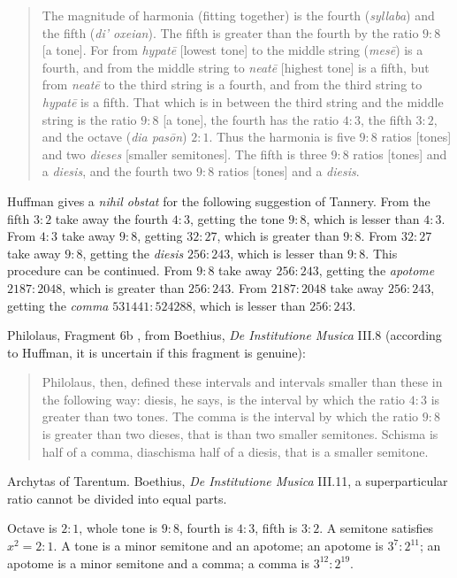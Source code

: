 \documentclass{article}
\theoremstyle{definition}
\begin{document}
\begin{quote}
The magnitude of harmonia (fitting together) is the fourth ({\em syllaba}) and the fifth ({\em di' oxeian}). The fifth is greater than the fourth
by the ratio $9:8$ [a tone]. For from {\em hypat\={e}} [lowest tone] to the middle string ({\em mes\={e}}) is a fourth, and from the middle string to {\em neat\={e}} [highest tone] is a
fifth, but from {\em neat\={e}} to the third string is a fourth, and from the third string to {\em hypat\={e}} is a fifth. That which is in between the third string and the middle string is the
ratio $9:8$ [a tone], the fourth has the ratio $4:3$, the fifth $3:2$, and the octave ({\em dia pas\={o}n}) $2:1$. Thus the harmonia is five $9:8$ ratios [tones] and two {\em dieses}
 [smaller semitones]. The fifth is three $9:8$ ratios [tones] and a {\em diesis}, and the fourth two $9:8$ ratios [tones] and a {\em diesis}.
\end{quote}

Huffman \cite[p.~164]{philolaus} gives a {\em nihil obstat} for the following suggestion of Tannery. 
From the fifth $3:2$ take away the fourth $4:3$, getting the tone $9:8$, which is lesser than $4:3$.
From $4:3$ take away $9:8$, getting $32:27$, which is greater than $9:8$. From
$32:27$ take away $9:8$, getting the {\em diesis} $256:243$, which is lesser than $9:8$. This procedure can be continued.
From $9:8$ take away $256:243$, getting the {\em apotome} $2187:2048$, which is greater than $256:243$. From
$2187:2048$ take away $256:243$, getting the {\em comma} $531441:524288$, which is lesser than $256:243$. 

Philolaus, Fragment 6b \cite[p.~364]{philolaus}, from Boethius, {\em De Institutione Musica} III.8 (according to Huffman, it is uncertain if this fragment is genuine):

\begin{quote}
Philolaus, then, defined these intervals and intervals smaller than these in the following way: diesis, he says, is the interval by which the ratio
$4:3$ is greater than two tones. The comma is the interval by which the ratio $9:8$ is greater than two dieses, that is than two smaller semitones. Schisma is half of a comma,
 diaschisma half of a diesis, that is a smaller semitone.
\end{quote}

Archytas of Tarentum. Boethius, {\em De Institutione Musica} III.11, a superparticular ratio cannot be divided into equal parts.

Octave is $2:1$, whole tone is $9:8$, fourth is $4:3$, fifth is $3:2$. A semitone satisfies $x^2=2:1$. A tone is a minor semitone and an apotome;
an apotome is $3^7:2^{11}$; an apotome is a minor semitone and a comma; a comma is $3^{12}:2^{19}$.
\end{document}
